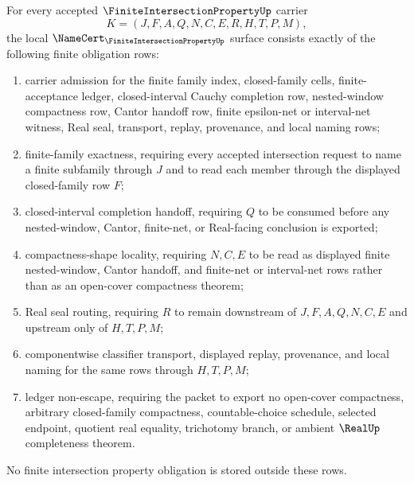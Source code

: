 \begin{theorem}
\label{thm:finite-intersection-property-namecert-obligations}
For every accepted $\FiniteIntersectionPropertyUp$ carrier
$$
K=(J,F,A,Q,N,C,E,R,H,T,P,M),
$$
the local $\NameCert_{\FiniteIntersectionPropertyUp}$ surface consists exactly of the following finite obligation rows:
\begin{enumerate}
\item carrier admission for the finite family index, closed-family cells, finite-acceptance ledger, closed-interval Cauchy completion row, nested-window compactness row, Cantor handoff row, finite epsilon-net or interval-net witness, Real seal, transport, replay, provenance, and local naming rows;
\item finite-family exactness, requiring every accepted intersection request to name a finite subfamily through $J$ and to read each member through the displayed closed-family row $F$;
\item closed-interval completion handoff, requiring $Q$ to be consumed before any nested-window, Cantor, finite-net, or Real-facing conclusion is exported;
\item compactness-shape locality, requiring $N,C,E$ to be read as displayed finite nested-window, Cantor handoff, and finite-net or interval-net rows rather than as an open-cover compactness theorem;
\item Real seal routing, requiring $R$ to remain downstream of $J,F,A,Q,N,C,E$ and upstream only of $H,T,P,M$;
\item componentwise classifier transport, displayed replay, provenance, and local naming for the same rows through $H,T,P,M$;
\item ledger non-escape, requiring the packet to export no open-cover compactness, arbitrary closed-family compactness, countable-choice schedule, selected endpoint, quotient real equality, trichotomy branch, or ambient $\RealUp$ completeness theorem.
\end{enumerate}
No finite intersection property obligation is stored outside these rows.
\end{theorem}
